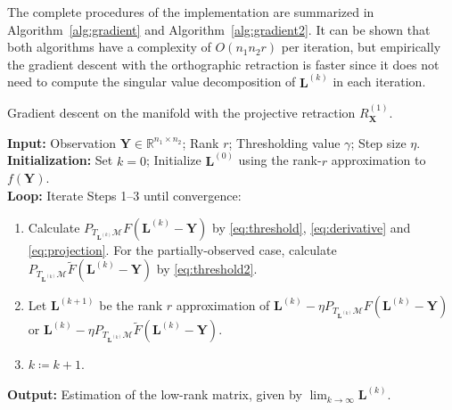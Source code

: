 \documentclass[12pt]{article}
\newcommand{\bX}{\boldsymbol{X}}
\newcommand{\bL}{\boldsymbol{L}}
\newcommand{\bSigma}{\boldsymbol\Sigma}
\newcommand{\bU}{\boldsymbol{U}}
\newcommand{\bV}{\boldsymbol{V}}
\def\reals{\mathbb{R}}
\def\bSigma{\boldsymbol\Sigma}
\def\bU{\boldsymbol{U}}
\def\bY{\boldsymbol{Y}}
\def\calM{\mathcal{M}}
\theoremstyle{plain}
\theoremstyle{definition}
\theoremstyle{plain}
\theoremstyle{plain}
\theoremstyle{remark}
\begin{document}
The complete procedures of the implementation are summarized in Algorithm~\ref{alg:gradient} and Algorithm~\ref{alg:gradient2}. It can be shown that both algorithms have a complexity of $O(n_1n_2r)$ per iteration, but empirically the gradient descent with the orthographic retraction is faster since it does not need to compute the singular value decomposition of $\bL^{(k)}$ in each iteration.




\begin{algorithm}[H]
\caption{Gradient descent on the manifold with the projective retraction $R_{\bX}^{(1)}$.}\label{alg:gradient}
\vspace{0.3cm}
{\bf Input:}  Observation $\bY\in\reals^{n_1\times n_2}$; Rank $r$; Thresholding value $\gamma$; Step size $\eta$. \\ 
{\bf Initialization:}  Set $k=0$; Initialize $\bL^{(0)}$ using the rank-$r$ approximation to $f(\bY)$.\\ %
{\bf Loop:} Iterate Steps 1--3 until convergence:
\begin{enumerate}
\item Calculate $P_{T_{\bL^{(k)}}\calM} F(\bL^{(k)}-\bY)$ by \eqref{eq:threshold}, \eqref{eq:derivative} and \eqref{eq:projection}. For the partially-observed case, calculate $P_{T_{\bL^{(k)}}\calM} \tilde{F}(\bL^{(k)}-\bY)$ by \eqref{eq:threshold2}.
\item Let $\bL^{(k+1)}$ be the rank $r$ approximation of $\bL^{(k)} - \eta  P_{T_{\bL^{(k)}}\calM} F(\bL^{(k)}-\bY)$ or $\bL^{(k)} - \eta  P_{T_{\bL^{(k)}}\calM} \tilde{F}(\bL^{(k)}-\bY)$.
\item $k\coloneqq k+1$. 
\end{enumerate}
{\bf Output:} Estimation of the low-rank matrix, given by $\lim_{k\rightarrow\infty}\bL^{(k)}$.
\vspace{0.3cm}
\end{algorithm}
\end{document}
